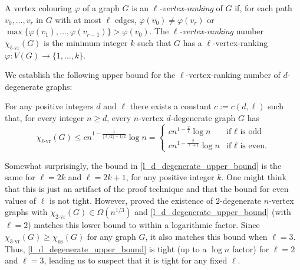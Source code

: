 \documentclass{patmorin}
\newcommand{\defin}[1]{\emph{\color{brightmaroon}#1}}
\newcommand{\rn}[1]{\chi_{\operatorname{#1-vr}}}
\newcommand{\trn}{\chi_{\mathrm{us}}}
\newcommand{\lrn}{\rn{\ell}}
\newcommand{\dexp}{1-\frac{1}{\lfloor\ell/2\rfloor+1/2}}
\begin{document}

A vertex colouring $\varphi$ of a graph $G$ is an \defin{$\ell$-vertex-ranking} of $G$ if, for each path $v_0,\ldots,v_r$ in $G$ with at most $\ell$ edges, $\varphi(v_0)\neq \varphi(v_r)$ or $\max\{\varphi(v_1),\ldots,\varphi(v_{r-1})\}>\varphi(v_0)$.  The \defin{$\ell$-vertex-ranking} number $\lrn(G)$ is the minimum integer $k$ such that $G$ has a $\ell$-vertex-ranking $\varphi:V(G)\to\{1,\ldots,k\}$.


We establish the following upper bound for the $\ell$-vertex-ranking number of $d$-degenerate graphs:

\begin{thm}\label{l_d_degenerate_upper_bound}
  For any positive integers $d$ and $\ell$ there exists a constant $c:=c(d,\ell)$ such that, for every integer $n\ge d$, every $n$-vertex $d$-degenerate graph $G$ has
  \[
    \lrn(G)\le c n^{\dexp}\log n
    = \begin{cases}
      cn^{1-\frac{2}{\ell}}\log n & \text{if $\ell$ is odd} \\
      cn^{1-\frac{2}{\ell+1}}\log n & \text{if $\ell$ is even.}
      \end{cases}
  \]
\end{thm}
Somewhat surprisingly, the bound in \cref{l_d_degenerate_upper_bound} is the same for $\ell=2k$ and $\ell=2k+1$, for any positive integer $k$.  One might think that this is just an artifact of the proof technique and that the bound for even values of $\ell$ is not tight.  However, \citet{karpas.neiman.ea:on} proved the existence of $2$-degenerate $n$-vertex graphs with $\rn{2}(G)\in\Omega(n^{1/3})$ and \cref{l_d_degenerate_upper_bound} (with $\ell=2$) matches this lower bound to within a logarithmic factor.  Since $\rn{3}(G)\ge\trn(G)$ for any graph $G$, it also matches this bound when $\ell=3$.  Thus, \cref{l_d_degenerate_upper_bound} is tight (up to a $\log n$ factor) for $\ell=2$ and $\ell=3$, leading us to suspect that it is tight for any fixed $\ell$.
\end{document}
